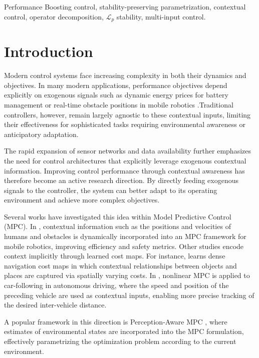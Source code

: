 \documentclass[journal,twoside,web]{ieeecolor}
\begin{document}
\begin{IEEEkeywords}
Performance Boosting control, stability-preserving parametrization, contextual control, operator decomposition, $\mathcal L_p$ stability, multi-input control.
\end{IEEEkeywords}
\section{Introduction}

Modern control systems face increasing complexity in both their dynamics and objectives. In many modern applications, performance objectives depend explicitly on exogenous signals such as dynamic energy prices for battery management \cite{ali2025optimal} or real-time obstacle positions in mobile robotics \cite{10680398}.Traditional controllers, however, remain largely agnostic to these contextual inputs, limiting their effectiveness for sophisticated tasks requiring environmental awareness or anticipatory adaptation.

The rapid expansion of sensor networks and data availability further emphasizes the need for control architectures that explicitly leverage exogenous contextual information. Improving control performance through contextual awareness has therefore become an active research direction. By directly feeding exogenous signals to the controller, the system can better adapt to its operating environment and achieve more complex objectives. 

Several works have investigated this idea within Model Predictive Control (MPC). In \cite{10680398}, contextual information such as the positions and velocities of humans and obstacles is dynamically incorporated into an MPC framework for mobile robotics, improving efficiency and safety metrics. Other studies encode context implicitly through learned cost maps. For instance, \cite{goel2023semantically} learns dense navigation cost maps in which contextual relationships between objects and places are captured via spatially varying costs. In \cite{10920056}, nonlinear MPC is applied to car-following in autonomous driving, where the speed and position of the preceding vehicle are used as contextual inputs, enabling more precise tracking of the desired inter-vehicle distance.


A popular framework in this direction is Perception-Aware MPC \cite{8593739,bonzanini2024perception,9867264}, where estimates of environmental states are incorporated into the MPC formulation, effectively parametrizing the optimization problem according to the current environment.
\end{document}
